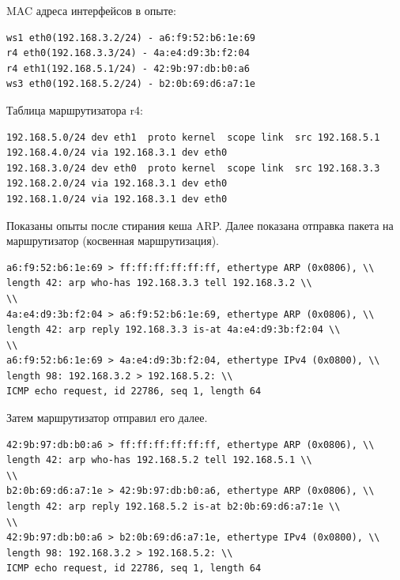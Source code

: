 \documentclass[a4paper,12pt]{article}
\begin{document}

MAC адреса интерфейсов в опыте:
\begin{Verbatim}
ws1 eth0(192.168.3.2/24) - a6:f9:52:b6:1e:69
r4 eth0(192.168.3.3/24) - 4a:e4:d9:3b:f2:04
r4 eth1(192.168.5.1/24) - 42:9b:97:db:b0:a6
ws3 eth0(192.168.5.2/24) - b2:0b:69:d6:a7:1e
\end{Verbatim}


Таблица маршрутизатора r4:
\begin{Verbatim}
192.168.5.0/24 dev eth1  proto kernel  scope link  src 192.168.5.1 
192.168.4.0/24 via 192.168.3.1 dev eth0 
192.168.3.0/24 dev eth0  proto kernel  scope link  src 192.168.3.3 
192.168.2.0/24 via 192.168.3.1 dev eth0 
192.168.1.0/24 via 192.168.3.1 dev eth0 
\end{Verbatim}

Показаны опыты после стирания кеша ARP.
Далее показана отправка пакета на маршрутизатор (косвенная маршрутизация). 

\begin{Verbatim}
a6:f9:52:b6:1e:69 > ff:ff:ff:ff:ff:ff, ethertype ARP (0x0806), \\ 
length 42: arp who-has 192.168.3.3 tell 192.168.3.2 \\
\\
4a:e4:d9:3b:f2:04 > a6:f9:52:b6:1e:69, ethertype ARP (0x0806), \\ 
length 42: arp reply 192.168.3.3 is-at 4a:e4:d9:3b:f2:04 \\
\\
a6:f9:52:b6:1e:69 > 4a:e4:d9:3b:f2:04, ethertype IPv4 (0x0800), \\ 
length 98: 192.168.3.2 > 192.168.5.2: \\
ICMP echo request, id 22786, seq 1, length 64
\end{Verbatim}

Затем маршрутизатор отправил его далее.

\begin{Verbatim}
42:9b:97:db:b0:a6 > ff:ff:ff:ff:ff:ff, ethertype ARP (0x0806), \\
length 42: arp who-has 192.168.5.2 tell 192.168.5.1 \\
\\
b2:0b:69:d6:a7:1e > 42:9b:97:db:b0:a6, ethertype ARP (0x0806), \\ 
length 42: arp reply 192.168.5.2 is-at b2:0b:69:d6:a7:1e \\
\\
42:9b:97:db:b0:a6 > b2:0b:69:d6:a7:1e, ethertype IPv4 (0x0800), \\ 
length 98: 192.168.3.2 > 192.168.5.2: \\
ICMP echo request, id 22786, seq 1, length 64
\end{Verbatim}
\end{document}
